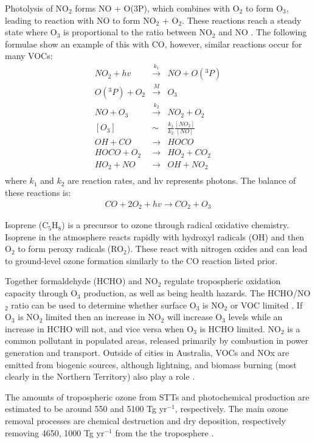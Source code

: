 Photolysis of NO$_2$ forms NO + O(3P), which combines with O$_2$ to form O$_3$, leading to reaction with NO to form NO$_2$ + O$_2$.
These reactions reach a steady state where O$_3$ is proportional to the ratio between NO$_2$ and NO \cite{Sillman_2002}.
The following formulae show an example of this with CO, however, similar reactions occur for many VOCs:
\begin{eqnarray*}
NO_2 + hv &\overset{k_1}{\rightarrow}& NO + O({}^3 P) \\
O({}^3 P) + O_2 &\overset{M}{\rightarrow}& O_3 \\
NO + O_3 &\overset{k_2}{\rightarrow}& NO_2 + O_2 \\
\left[O_3\right] &\sim& \frac{k_1}{k_2} \frac{\left[NO_2\right]}{\left[NO\right]} \\
OH + CO &{\rightarrow}& HOCO \\
HOCO + O_2 &{\rightarrow}& HO_2 + CO_2 \\
HO_2 + NO &{\rightarrow}& OH + NO_2 \\
\end{eqnarray*}
where $k_1$ and $k_2$ are reaction rates, and hv represents photons.
The balance of these reactions is:
\begin{eqnarray*} CO + 2O_2 + hv {\rightarrow} CO_2 + O_3 \end{eqnarray*}

Isoprene (C$_5$H$_8$) is a precursor to ozone through radical oxidative chemistry. Isoprene in the atmosphere reacts rapidly with hydroxyl radicals (OH) and then O$_2$ to form peroxy radicals (RO$_2$).
These react with nitrogen oxides and can lead to ground-level ozone formation similarly to the CO reaction listed prior.

Together formaldehyde (HCHO) and NO$_2$ regulate tropospheric oxidation capacity through O$_3$ production, as well as being health hazards.
The HCHO/NO$_2$ ratio can be used to determine whether surface O$_3$ is NO$_2$ or VOC limited \cite{Mahajan_2015}.
If O$_3$ is NO$_2$ limited then an increase in NO$_2$ will increase O$_3$ levels while an increase in HCHO will not, and vice versa when O$_3$ is HCHO limited.
NO$_2$ is a common pollutant in populated areas, released primarily by combustion in power generation and transport. 
Outside of cities in Australia, VOCs and NOx are emitted from biogenic sources, although lightning, and biomass burning (most clearly in the Northern Territory) also play a role \cite{Guenther_2006, VanDerA_2008}.

The amounts of tropospheric ozone from STTs and photochemical production are estimated to be around 550 and 5100 Tg yr$^{-1}$, respectively. 
The main ozone removal processes are chemical destruction and dry deposition, respectively removing 4650, 1000 Tg yr$^{-1}$ from the the troposphere \cite{Stevenson_2006}.